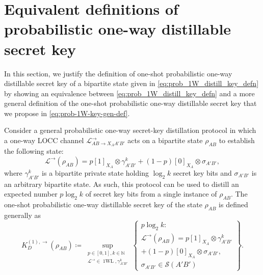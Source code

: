 \documentclass[twocolumn,letterpaper, dvipsnames,allowtoday, accepted = 2025-12-31]{quantumarticle}
\begin{document}



\pagebreak
\onecolumn
\appendix
\large 

\section{Equivalent definitions of probabilistic one-way distillable secret key}

\label{app:prob_dist_key_eq_defn}

In this section, we justify the definition of one-shot probabilistic one-way distillable secret key of a bipartite state given in \eqref{eq:prob_1W_distill_key_defn} by showing an equivalence between \eqref{eq:prob_1W_distill_key_defn} and a more general definition of the one-shot probabilistic one-way distillable secret key that we propose in \eqref{eq:prob-1W-key-gen-def}.

Consider a general probabilistic one-way secret-key distillation protocol in which a one-way LOCC channel $\mathcal{L}^{\to}_{AB\to X_AA'B'}$ acts on a bipartite state $\rho_{AB}$ to establish the following state:
\begin{equation}\label{eq:key_distill_arb_form}
    \mathcal{L}^{\to}\!\left(\rho_{AB}\right) = p[1]_{X_A}\otimes\gamma^k_{A'B'} + (1-p)[0]_{X_A}\otimes\sigma_{A'B'},
\end{equation}
where $\gamma^k_{A'B'}$ is a bipartite private state holding $\log_2 k$ secret key bits and $\sigma_{A'B'}$ is an arbitrary bipartite state. As such, this protocol can be used to distill an expected number $p\log_2 k$ of  secret key bits from a single instance of $\rho_{AB}$. The one-shot probabilistic one-way distillable secret key of the state $\rho_{AB}$ is defined generally as
\begin{equation}
\label{eq:prob-1W-key-gen-def}
        K_{D}^{(1),\to}(\rho_{AB}) \coloneqq
        \sup_{\substack{p \in [0,1], k\in \mathbb{N}\\ \mathcal{L}^{\to} \in \operatorname{1WL}, \gamma^k_{A'B'}}}\left\{
        \begin{array}{c}
             p \log_2 k:\\
             \mathcal{L}^{\to}\!\left(\rho_{AB}\right) =
             p[1]_{X_A}\otimes\gamma^k_{A'B'} \\
             + (1-p)[0]_{X_A}\otimes\sigma_{A'B'},\\
             \sigma_{A'B'}\in \mathcal{S}\!\left(A'B'\right)
        \end{array}
        \right\}.
    \end{equation}
\end{document}
